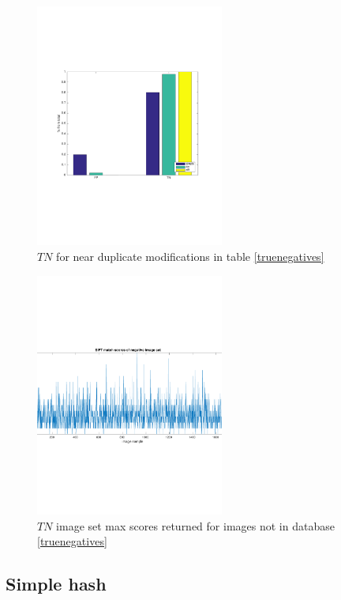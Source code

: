 \documentclass[english,12pt,a4paper,pdftex,elec,utf8]{aaltothesis}
\begin{document}
\begin{figure}[htb]
\begin{center}
\includegraphics[height=8cm]{figures/tnBar}
\end{center}
\caption{ $TN$ for near duplicate modifications in table \ref{truenegatives} }
\label{tntotal}
\end{figure}

\begin{figure}[htb]
\begin{center}
\includegraphics[height=8cm]{figures/cutoff}
\end{center}
\caption{ $TN$ image set max scores returned for images not in database \ref{truenegatives} }
\label{sifttnscores}
\end{figure}




\subsection{Simple hash}
\end{document}
